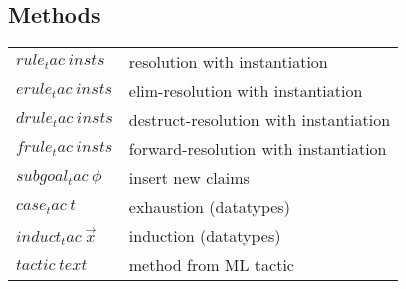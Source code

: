 \subsection{Methods}

\begin{tabular}{ll}
  $rule_tac~insts$ & resolution with instantiation \\
  $erule_tac~insts$ & elim-resolution with instantiation \\
  $drule_tac~insts$ & destruct-resolution with instantiation \\
  $frule_tac~insts$ & forward-resolution with instantiation \\
  $subgoal_tac~\phi$ & insert new claims \\
  $case_tac~t$ & exhaustion (datatypes) \\
  $induct_tac~\vec x$ & induction (datatypes) \\
  $tactic~text$ & method from ML tactic \\
\end{tabular}


